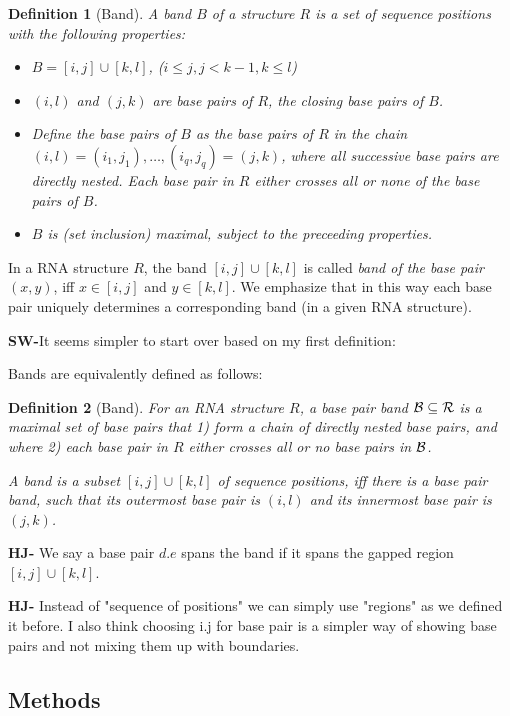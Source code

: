 \documentclass[11pt]{article} %
\newtheorem{definition}{Definition}
\newcommand{\SW}[1]{\textbf{SW-}#1}
\begin{document}
\begin{definition}[Band]
A \emph{band} $B$ of a structure $R$ is a set of sequence positions with the following properties:
\begin{itemize}
\item $B=[i,j]\cup[k,l]$, ($i\leq j, j<k-1, k\leq l$)
\item $(i,l)$ and $(j,k)$ are base pairs of $R$, the \emph{closing base pairs of $B$}.
\item Define the \emph{base pairs of $B$} as the base pairs of $R$
in the chain $(i,l)=(i_1,j_1), \dots, (i_q,j_q)=(j,k)$, where all successive base pairs are directly nested.
 Each base pair in $R$ either crosses all or none of the base pairs of $B$. 
\item $B$ is (set inclusion) maximal, subject to the preceeding properties.
\end{itemize}
\end{definition}

In a RNA structure $R$, the band $[i,j]\cup[k,l]$ is called \emph{band of the base pair $(x,y)$}, iff $x\in[i,j]$ and $y\in[k,l]$. We emphasize that in this way each base pair uniquely determines a corresponding band (in a given RNA structure).

\SW{It seems simpler to start over based on my first definition:}

Bands are equivalently defined as follows:

\begin{definition}[Band]
For an RNA structure $R$, a \emph{base pair band $\cal B\subseteq R$} is a maximal set of base pairs that 1) form a chain of directly nested base pairs, and where 2) each base pair in $R$ either crosses all or no base pairs in $\cal B$.

A \emph{band} is a subset $[i,j]\cup[k,l]$ of sequence positions, iff there is a base pair band, such that its outermost base pair is $(i,l)$ and its innermost base pair is $(j,k)$.
\end{definition}
\textbf{HJ-} We say a base pair $d.e$ spans the band if it spans the gapped region $[i,j]\cup[k,l]$.

\textbf{HJ-} Instead of "sequence of positions" we can simply use "regions" as we defined it before. I also think choosing i.j for base pair is a simpler way of showing base pairs and not mixing them up with boundaries.


\subsection{Methods}
\end{document}
